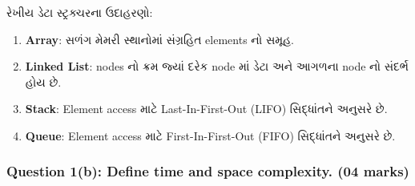 રેખીય ડેટા સ્ટ્રક્ચરના ઉદાહરણો:

\begin{enumerate}
\def\labelenumi{\arabic{enumi}.}
\tightlist
\item
  \textbf{Array}: સળંગ મેમરી સ્થાનોમાં સંગ્રહિત elements નો સમૂહ.
\item
  \textbf{Linked List}: nodes નો ક્રમ જ્યાં દરેક node માં ડેટા અને આગળના node
  નો સંદર્ભ હોય છે.
\item
  \textbf{Stack}: Element access માટે Last-In-First-Out (LIFO) સિદ્ધાંતને
  અનુસરે છે.
\item
  \textbf{Queue}: Element access માટે First-In-First-Out (FIFO) સિદ્ધાંતને
  અનુસરે છે.
\end{enumerate}

\begin{Shaded}
\begin{Highlighting}[]



\end{Highlighting}
\end{Shaded}

\hypertarget{question-1b-define-time-and-space-complexity.-04-marks}{%
\subsubsection{Question 1(b): Define time and space complexity. (04
marks)}\label{question-1b-define-time-and-space-complexity.-04-marks}}

